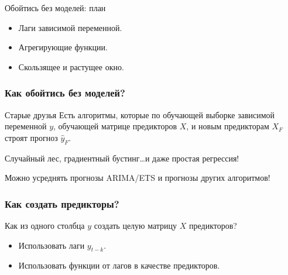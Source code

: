 
\begin{frame} %


\end{frame}



\begin{frame}{Обойтись без моделей: план}
  \begin{itemize}[<+->]
    \item \alert{Лаги зависимой} переменной. 
    \item \alert{Агрегирующие функции}.
    \item \alert{Скользящее и растущее окно}. 
  \end{itemize}

\end{frame}


\begin{frame}
  \frametitle{Как обойтись без моделей?}

  \begin{block}{Старые друзья}
    Есть алгоритмы, которые по обучающей выборке зависимой переменной $y$, 
    обучающей матрице предикторов $X$, и новым предикторам $X_F$ строят прогноз $\hat y_F$.      
  \end{block}

  \pause

  \alert{Случайный лес}, \alert{градиентный бустинг}\ldots \pause и даже \alert{простая регрессия}!

  \pause 

  Можно \alert{усреднять} прогнозы ARIMA/ETS и прогнозы других алгоритмов!

\end{frame}


\begin{frame}
  \frametitle{Как создать предикторы?}

  Как из одного столбца $y$ создать целую матрицу $X$ предикторов?

  \begin{itemize}[<+->]
    \item Использовать лаги $y_{t-k}$. 
    \item Использовать функции от лагов в качестве предикторов. 
  \end{itemize}


\end{frame}

